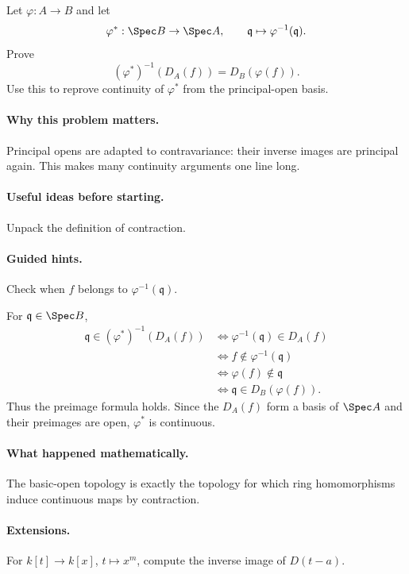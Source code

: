 \begin{problem}
Let $\varphi:A\to B$ and let
\[
\varphi^\ast:\Spec B\to\Spec A,
\qquad
\mathfrak q\mapsto\varphi^{-1}(\mathfrak q).
\]
Prove
\[
(\varphi^\ast)^{-1}(D_A(f))=D_B(\varphi(f)).
\]
Use this to reprove continuity of $\varphi^\ast$ from the principal-open basis.
\end{problem}

\paragraph{Why this problem matters.}
Principal opens are adapted to contravariance: their inverse images are principal again.
This makes many continuity arguments one line long.

\paragraph{Useful ideas before starting.}
Unpack the definition of contraction.

\paragraph{Guided hints.}
Check when $f$ belongs to $\varphi^{-1}(\mathfrak q)$.

\begin{solution}
For $\mathfrak q\in\Spec B$,
\[
\begin{aligned}
\mathfrak q\in(\varphi^\ast)^{-1}(D_A(f))
&\iff \varphi^{-1}(\mathfrak q)\in D_A(f)\\
&\iff f\notin\varphi^{-1}(\mathfrak q)\\
&\iff \varphi(f)\notin\mathfrak q\\
&\iff \mathfrak q\in D_B(\varphi(f)).
\end{aligned}
\]
Thus the preimage formula holds.  Since the $D_A(f)$ form a basis of $\Spec A$ and their
preimages are open, $\varphi^\ast$ is continuous.
\end{solution}

\paragraph{What happened mathematically.}
The basic-open topology is exactly the topology for which ring homomorphisms induce
continuous maps by contraction.

\paragraph{Extensions.}
For $k[t]\to k[x]$, $t\mapsto x^m$, compute the inverse image of $D(t-a)$.
